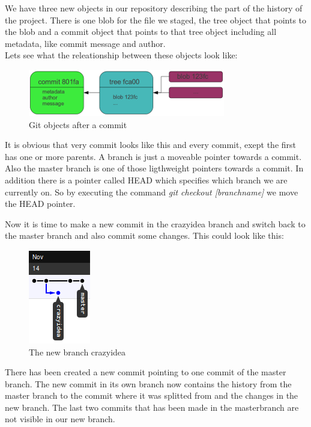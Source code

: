 We have three new objects in our repository describing the part of the history
of the project. There is one blob for the file we staged, the tree object that
points to the blob and a commit object that points to that tree object including
all metadata, like commit message and author. 
\\

Lets see what the releationship between these objects look like:

\begin{figure}[h]
  \includegraphics{img/branch2}
  \caption{Git objects after a commit}
  \label{fig: git objects after a commit}
\end{figure}

It is obvious that very commit looks like this and every commit, exept the first
has one or more parents.
A branch is just a moveable pointer towards a commit. Also the master branch is
one of those ligthweight pointers towards a commit. In addition there is a
pointer called HEAD which specifies which branch we are currently on. So by
executing the command \emph{git checkout [branchname]} we move the HEAD
pointer. 

Now it is time to make a new commit in the crazyidea branch and switch back to
the master branch and also commit some changes.
This could look like this:
\begin{figure}[h]
  \centering
  \includegraphics{img/branch3}
  \caption{The new branch crazyidea}
  \label{fig: a new branch}
\end{figure}

There has been created a new commit pointing to one commit of the master branch.
The new commit in its own branch now contains the history from the master branch
to the commit where it was splitted from and the changes in the new
branch. The last two commits that has been made in the masterbranch are not
visible in our new branch. 


